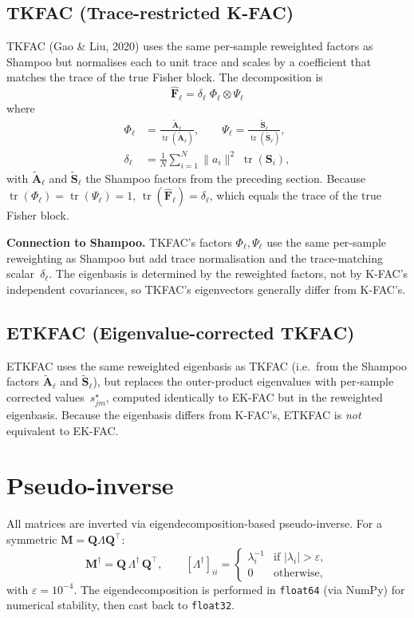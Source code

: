 \documentclass[11pt]{article}
\DeclareMathOperator{\tr}{tr}
\newcommand{\kron}{\otimes}
\begin{document}
\subsection{TKFAC (Trace-restricted K-FAC)}

TKFAC (Gao \& Liu, 2020) uses the same per-sample reweighted factors
as Shampoo but normalises each to unit trace and scales by a
coefficient that matches the trace of the true Fisher block.
The decomposition is
\[
  \hat{\mathbf{F}}_\ell
  = \delta_\ell \;\Phi_\ell \kron \Psi_\ell
\]
where
\begin{align*}
  \Phi_\ell
  &= \frac{\tilde{\mathbf{A}}_\ell}{\tr(\tilde{\mathbf{A}}_\ell)}, \qquad
  \Psi_\ell
  = \frac{\tilde{\mathbf{S}}_\ell}{\tr(\tilde{\mathbf{S}}_\ell)}, \\[4pt]
  \delta_\ell
  &= \frac{1}{N}\sum_{i=1}^{N}
    \|a_i\|^2\;\tr(\mathbf{S}_i),
\end{align*}
with $\tilde{\mathbf{A}}_\ell$ and $\tilde{\mathbf{S}}_\ell$ the
Shampoo factors from the preceding section.  Because
$\tr(\Phi_\ell)=\tr(\Psi_\ell)=1$,
$\tr(\hat{\mathbf{F}}_\ell)=\delta_\ell$,
which equals the trace of the true Fisher block.

\medskip
\noindent\textbf{Connection to Shampoo.}\quad
TKFAC's factors $\Phi_\ell,\Psi_\ell$ use the same per-sample
reweighting as Shampoo but add trace normalisation and the
trace-matching scalar~$\delta_\ell$.
The eigenbasis is determined by the reweighted factors, not by
K-FAC's independent covariances, so TKFAC's eigenvectors generally
differ from K-FAC's.

\subsection{ETKFAC (Eigenvalue-corrected TKFAC)}

ETKFAC uses the same reweighted eigenbasis as TKFAC (i.e.\ from
the Shampoo factors $\tilde{\mathbf{A}}_\ell$ and
$\tilde{\mathbf{S}}_\ell$), but replaces the outer-product
eigenvalues with per-sample corrected values~$s^\star_{jm}$,
computed identically to EK-FAC but in the reweighted eigenbasis.
Because the eigenbasis differs from K-FAC's, ETKFAC is
\emph{not} equivalent to EK-FAC.

\section{Pseudo-inverse}

All matrices are inverted via eigendecomposition-based pseudo-inverse.
For a symmetric $\mathbf{M} = \mathbf{Q}\Lambda\mathbf{Q}^\top$:
\[
  \mathbf{M}^\dagger
  = \mathbf{Q}\,\Lambda^\dagger\,\mathbf{Q}^\top,
  \qquad
  [\Lambda^\dagger]_{ii}
  = \begin{cases}
      \lambda_i^{-1} & \text{if } |\lambda_i|>\varepsilon,\\
      0 & \text{otherwise},
    \end{cases}
\]
with $\varepsilon=10^{-4}$.  The eigendecomposition is performed in
\texttt{float64} (via NumPy) for numerical stability, then cast
back to \texttt{float32}.
\end{document}
